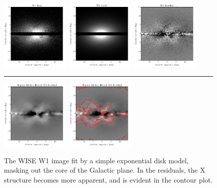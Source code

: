 \documentclass[12pt, preprint]{aastex}
\begin{document}
\begin{figure}[h!]
\centering
\includegraphics[width=0.3\textwidth]{xbulge-04}
\includegraphics[width=0.3\textwidth]{xbulge-08}
\includegraphics[width=0.3\textwidth]{xbulge-09}
\\
\rule{0.3\textwidth}{0pt}
\includegraphics[width=0.3\textwidth]{xbulge-10}
\includegraphics[width=0.3\textwidth]{xbulge-11}
\caption{The WISE W1 image fit by a simple exponential disk model, masking
  out the core of the Galactic plane.  In the residuals, the X
  structure becomes more apparent, and is evident in the contour plot.}
\label{fig:modfit}
\end{figure}
\end{document}
